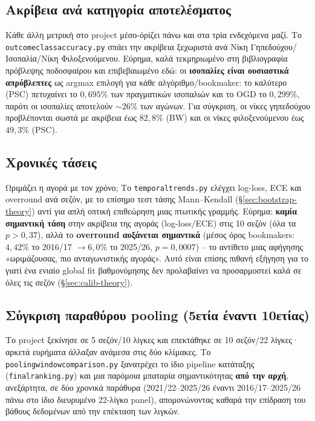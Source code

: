 \documentclass[11pt,a4paper]{article}
\newcommand{\file}[1]{\texttt{#1}}
\renewcommand{\_}{\oldunderscore\allowbreak}
\begin{document}
\subsection{Ακρίβεια ανά κατηγορία αποτελέσματος}

Κάθε άλλη μετρική στο project μέσο-όρίζει πάνω και στα τρία ενδεχόμενα μαζί. Το
\file{outcome\_class\_accuracy.py} σπάει την ακρίβεια ξεχωριστά ανά Νίκη
Γηπεδούχου/Ισοπαλία/Νίκη Φιλοξενούμενου. Εύρημα, καλά τεκμηριωμένο στη βιβλιογραφία
πρόβλεψης ποδοσφαίρου και επιβεβαιωμένο εδώ: οι \textbf{ισοπαλίες είναι ουσιαστικά
απρόβλεπτες} ως argmax επιλογή για κάθε αλγόριθμο/bookmaker: το καλύτερο (PSC) πετυχαίνει
το $0{,}695\%$ των πραγματικών ισοπαλιών και το OGD το $0{,}299\%$, παρότι οι ισοπαλίες
αποτελούν $\sim$26\% των αγώνων. Για σύγκριση, οι νίκες γηπεδούχου προβλέπονται σωστά με
ακρίβεια έως $82{,}8\%$ (BW) και οι νίκες φιλοξενούμενου έως $49{,}3\%$ (PSC).

\subsection{Χρονικές τάσεις}
\label{sec:temporal}

Ωριμάζει η αγορά με τον χρόνο; Το \file{temporal\_trends.py} ελέγχει log-loss, ECE και
overround ανά σεζόν, με το επίσημο τεστ τάσης Mann--Kendall
(\S\ref{sec:bootstrap-theory}) αντί για απλή οπτική επιθεώρηση μιας πτωτικής γραμμής.
Εύρημα: \textbf{καμία σημαντική τάση} στην ακρίβεια της αγοράς (log-loss/ECE) στις 10
σεζόν (όλα τα $p>0{,}37$), αλλά το \textbf{overround αυξάνεται σημαντικά} (μέσος όρος
bookmakers: $4{,}42\%$ το 2016/17 $\to 6{,}0\%$ το 2025/26, $p=0{,}0007$) --
το αντίθετο μιας αφήγησης «ωριμάζουσας, πιο ανταγωνιστικής αγοράς». Αυτό είναι επίσης
πιθανή εξήγηση για το γιατί ένα ενιαίο global fit βαθμονόμησης δεν προλαβαίνει να
προσαρμοστεί καλά σε όλες τις σεζόν (\S\ref{sec:calib-theory}).

\subsection{Σύγκριση παραθύρου pooling (5ετία έναντι 10ετίας)}
\label{sec:pooling}

Το project ξεκίνησε σε 5 σεζόν/10 λίγκες και επεκτάθηκε σε 10 σεζόν/22 λίγκες· αρκετά
ευρήματα άλλαξαν ανάμεσα στις δύο κλίμακες. Το \file{pooling\_window\_comparison.py}
ξανατρέχει το ίδιο pipeline κατάταξης (\file{final\_ranking.py}) και μια παρόμοια μπαταρία
σημαντικότητας \textbf{από την αρχή}, ανεξάρτητα, σε δύο χρονικά παράθυρα (2021/22--2025/26
έναντι 2016/17--2025/26 πάνω στο ίδιο διευρυμένο 22-λίγκο panel), απομονώνοντας καθαρά την
επίδραση του βάθους δεδομένων από την επέκταση των λιγκών.
\end{document}
